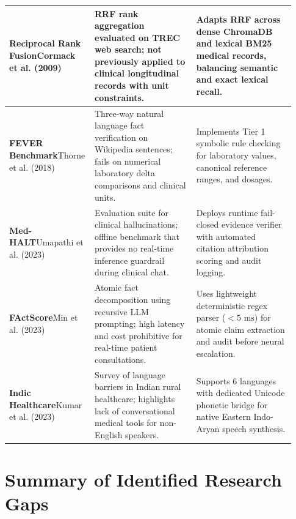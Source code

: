 \begin{longtable}{@{}p{0.24\linewidth} p{0.35\linewidth} p{0.34\linewidth}@{}}
\midrule
\textbf{Reciprocal Rank Fusion}\newline Cormack et al. (2009)~\cite{cormack2009rrf} & RRF rank aggregation evaluated on TREC web search; not previously applied to clinical longitudinal records with unit constraints. & Adapts RRF across dense ChromaDB and lexical BM25 medical records, balancing semantic and exact lexical recall. \\
\midrule
\textbf{FEVER Benchmark}\newline Thorne et al. (2018)~\cite{thorne2018fever} & Three-way natural language fact verification on Wikipedia sentences; fails on numerical laboratory delta comparisons and clinical units. & Implements Tier 1 symbolic rule checking for laboratory values, canonical reference ranges, and dosages. \\
\midrule
\textbf{Med-HALT}\newline Umapathi et al. (2023)~\cite{umapathi2023medhalt} & Evaluation suite for clinical hallucinations; offline benchmark that provides no real-time inference guardrail during clinical chat. & Deploys runtime fail-closed evidence verifier with automated citation attribution scoring and audit logging. \\
\midrule
\textbf{FActScore}\newline Min et al. (2023)~\cite{min2023factscore} & Atomic fact decomposition using recursive LLM prompting; high latency and cost prohibitive for real-time patient consultations. & Uses lightweight deterministic regex parser ($<5\text{ ms}$) for atomic claim extraction and audit before neural escalation. \\
\midrule
\textbf{Indic Healthcare}\newline Kumar et al. (2023)~\cite{kumar2023linguistic} & Survey of language barriers in Indian rural healthcare; highlights lack of conversational medical tools for non-English speakers. & Supports 6 languages with dedicated Unicode phonetic bridge for native Eastern Indo-Aryan speech synthesis. \\
\bottomrule
\end{longtable}
\normalsize


\section{Summary of Identified Research Gaps}
\label{sec:lit_summary_gaps}

